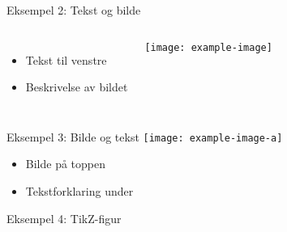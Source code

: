 \documentclass{beamer}
\begin{document}
	\begin{frame}{Eksempel 2: Tekst og bilde}
		\begin{columns}
			\begin{itemize}
				\item Tekst til venstre
				\item Beskrivelse av bildet
			\end{itemize}
			\texttt{[image: example-image]}
		\end{columns}
	\end{frame}
	
	\begin{frame}{Eksempel 3: Bilde og tekst}
		\centering
		\texttt{[image: example-image-a]}
		\vspace{0.5cm}
		
		\begin{itemize}
			\item Bilde på toppen
			\item Tekstforklaring under
		\end{itemize}
	\end{frame}
	
	\begin{frame}{Eksempel 4: TikZ-figur}
	\end{frame}
	
\end{document}
